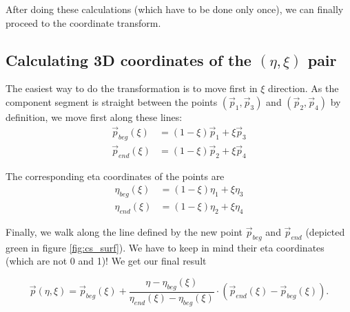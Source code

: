After doing these calculations (which have to be done only once), we can finally proceed to the coordinate transform.

\subsection{Calculating 3D coordinates of the $(\eta, \xi)$ pair}
The easiest way to do the transformation is to move first in $\xi$ direction. As the component segment is straight between the points $(\vec p_1, \vec p_3)$ and $(\vec p_2, \vec p_4)$ by definition, we move first along these lines:
\begin{align}
\vec p_{beg}(\xi) &= (1-\xi)\vec p_1 + \xi \vec p_3 \\
\vec p_{end}(\xi) &= (1-\xi)\vec p_2 + \xi \vec p_4
\end{align}

The corresponding eta coordinates of the points are 
\begin{align}
\eta_{beg}(\xi) &= (1-\xi)\eta_1 + \xi \eta_3 \\
\eta_{end}(\xi) &= (1-\xi)\eta_2 + \xi \eta_4
\end{align}

Finally, we walk along the line defined by the new point $\vec p_{beg}$ and $\vec p_{end}$ (depicted green in figure \ref{fig:cs_surf}). We have to keep in mind their eta coordinates (which are not 0 and 1)! We get our final result

\begin{equation}
\vec p(\eta, \xi) = \vec p_{beg} (\xi) + \frac {\eta - \eta_{beg}(\xi)}{\eta_{end}(\xi) - \eta_{beg}(\xi)} \cdot \left( \vec p_{end}(\xi) - \vec p_{beg}(\xi) \right).
\end{equation}
